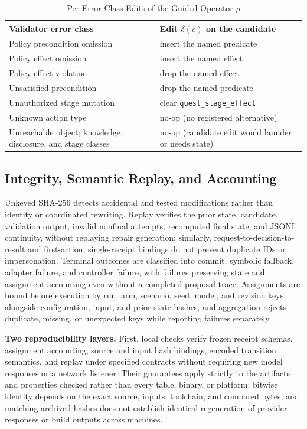\documentclass[journal]{IEEEtran}
\begin{document}
\begin{table}[!tbp]
\caption{Per-Error-Class Edits of the Guided Operator $\rho$}
\label{tab:rho-rules}
\centering
\footnotesize
\begin{tabularx}{\columnwidth}{@{}>{\raggedright\arraybackslash}X>{\raggedright\arraybackslash}X@{}}
\toprule
\textbf{Validator error class} & \textbf{Edit $\delta(e)$ on the candidate} \\
\midrule
Policy precondition omission & insert the named predicate \\
Policy effect omission & insert the named effect \\
Policy effect violation & drop the named effect \\
Unsatisfied precondition & drop the named predicate \\
Unauthorized stage mutation & clear \texttt{quest\_stage\_effect} \\
Unknown action type & no-op (no registered alternative) \\
Unreachable object; knowledge, disclosure, and stage classes & no-op (candidate edit would launder or needs state) \\
\bottomrule
\end{tabularx}
\end{table}

\subsection{Integrity, Semantic Replay, and Accounting}\label{sec:audit}
Unkeyed SHA-256 detects accidental and tested modifications rather than identity or coordinated rewriting. Replay verifies the prior state, candidate, validation output, invalid nonfinal attempts, recomputed final state, and JSONL continuity, without replaying repair generation; similarly, request-to-decision-to-result and first-action, single-receipt bindings do not prevent duplicate IDs or impersonation. Terminal outcomes are classified into commit, symbolic fallback, adapter failure, and controller failure, with failures preserving state and assignment accounting even without a completed proposal trace. Assignments are bound before execution by run, arm, scenario, seed, model, and revision keys alongside configuration, input, and prior-state hashes, and aggregation rejects duplicate, missing, or unexpected keys while reporting failures separately.

\textbf{Two reproducibility layers.} First, local checks verify frozen receipt schemas, assignment accounting, source and input hash bindings, encoded transition semantics, and replay under specified contracts without requiring new model responses or a network listener. Their guarantees apply strictly to the artifacts and properties checked rather than every table, binary, or platform: bitwise identity depends on the exact source, inputs, toolchain, and compared bytes, and matching archived hashes does not establish identical regeneration of provider responses or build outputs across machines.
\end{document}
